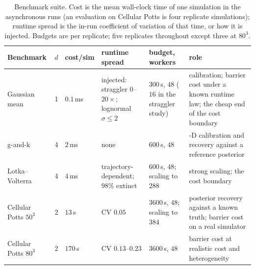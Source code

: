 \documentclass[10pt]{article}
\theoremstyle{plain}
\theoremstyle{definition}
\begin{document}
\begin{table}[t]
\caption{Benchmark suite. Cost is the mean wall-clock time of one simulation in the asynchronous runs (an evaluation on Cellular Potts is four replicate simulations); runtime spread is the in-run coefficient of variation of that time, or how it is injected. Budgets are per replicate; five replicates throughout except three at $80^3$.}\label{tab:benchmarks}
\centering
\footnotesize
\setlength{\tabcolsep}{3pt}
\begin{tabular}{@{}>{\raggedright\arraybackslash}p{}c>{\raggedright\arraybackslash}p{}>{\raggedright\arraybackslash}p{}>{\raggedright\arraybackslash}p{}>{\raggedright\arraybackslash}p{}@{}}
\toprule
Benchmark & $d$ & cost/sim & runtime spread & budget, workers & role \\
\midrule
Gaussian mean & 1 & $0.1$\,ms & injected: straggler $0$--$20\times$; lognormal $\sigma\le2$ & $300$\,s, $48$ ($16$ in the straggler study) & calibration; barrier cost under a known runtime law; the cheap end of the cost boundary \\
g-and-k & 4 & $2$\,ms & none & $600$\,s, $48$ & 4-D calibration and recovery against a reference posterior \\
Lotka--Volterra & 4 & $4$\,ms & trajectory-dependent; $98\%$ extinct & $600$\,s, $48$; scaling to $288$ & strong scaling; the cost boundary \\
Cellular Potts $50^3$ & 2 & $13$\,s & CV $0.05$ & $3600$\,s, $48$; scaling to $384$ & posterior recovery against a known truth; barrier cost on a real simulator \\
Cellular Potts $80^3$ & 2 & $170$\,s & CV $0.13$--$0.23$ & $3600$\,s, $48$ & barrier cost at realistic cost and heterogeneity \\
\bottomrule
\end{tabular}
\end{table}
\end{document}
